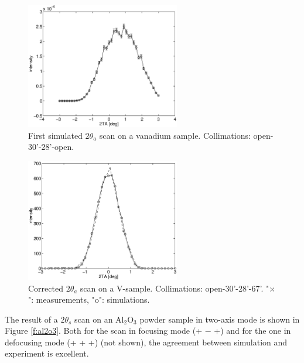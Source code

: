 \begin{figure}
  \begin{center}
    \includegraphics[width=0.6\textwidth]{figures/vanadium-plot-1.eps}
  \end{center}
\caption{First simulated $2\theta_a$ scan on a vanadium sample.
Collimations: open-30'-28'-open.}
\label{f:v_2ta_offset}
\end{figure}

\begin{figure}
  \begin{center}
    \includegraphics[width=0.6\textwidth]{figures/vanadium-plot-2.eps}
  \end{center}
\caption{Corrected $2\theta_a$ scan on a V-sample.
Collimations: open-30'-28'-67'.
"$\times$": measurements, "o": simulations.}
\label{f:v_2ta_zero}
\end{figure}

The result of a $2\theta_s$ scan on an Al$_2$O$_3$
powder sample in two-axis mode is shown in Figure \ref{f:al2o3}.
Both for the scan in focusing mode (+ $-$ +)
and for the one in defocusing mode (+ + +) (not shown),
the agreement between simulation and experiment is excellent.

